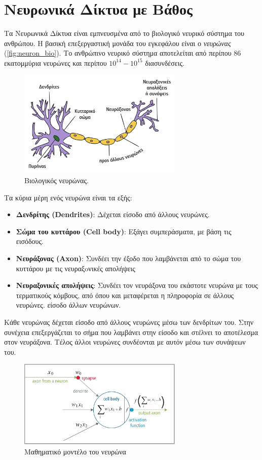 \section{Νευρωνικά Δίκτυα με Βάθος}
\label{sec:theory_dnn}

Τα Νευρωνικά Δίκτυα είναι εμπνευσμένα από το βιολογικό νευρικό σύστημα
του ανθρώπου. Η βασική επεξεργαστική μονάδα του εγκεφάλου είναι ο \emph{νευρώνας} (\autoref{fig:neuron_bio}).
Το ανθρώπινο νευρικό σύστημα αποτελείται από περίπου 86 εκατομμύρια νευρώνες και περίπου
$10^14 - 10^15$ διασυνδέσεις.
\begin{figure}[!ht]
  \centering
  \includegraphics[width=0.7\textwidth]{./images/chapter3/neuron.png}
  \caption[Βιολογικός Νευρώνας]{Βιολογικός νευρώνας.}
  \label{fig:neuron_bio}
\end{figure}
Τα κύρια μέρη ενός νευρώνα είναι τα εξής:
\begin{itemize}
  \item{\textbf{Δενδρίτης (Dendrites)}: Δέχεται είσοδο από άλλους νευρώνες.}
  \item{\textbf{Σώμα του κυττάρου (Cell body)}: Εξάγει συμπεράσματα, με βάση τις εισόδους.}
  \item{\textbf{Νευράξονας (Axon)}: Συνδέει την έξοδο που λαμβάνεται από το σώμα του κυττάρου με τις νευραξoνικές απολήψεις}
  \item{\textbf{Νευραξονικές απολήψεις}: Συνδέει τον νευράξονα του εκάστοτε νευρώνα με τους τερματικούς κόμβους,
    από όπου και μεταφέρεται η πληροφορία σε άλλους νευρώνες.
    είσοδο άλλων νευρώνων.}
\end{itemize}
Κάθε νευρώνας δέχεται είσοδο από άλλους νευρώνες μέσω των δενδρίτων του.
Στην συνέχεια επεξεργάζεται το σήμα που λαμβάνει στην είσοδο και
στέλνει το αποτέλεσμα στον νευράξονα. Τέλος άλλοι νευρώνες συνδέονται με αυτόν
μέσω των συνάψεων του.

\begin{figure}[!ht]
  \centering
  \includegraphics[width=0.7\textwidth]{./images/chapter3/neuron_model.jpg}
  \caption[Μαθηματικό μοντέλο του νευρώνα]{Μαθηματικό μοντέλο του νευρώνα}
  \label{fig:neuron_model}
\end{figure}

